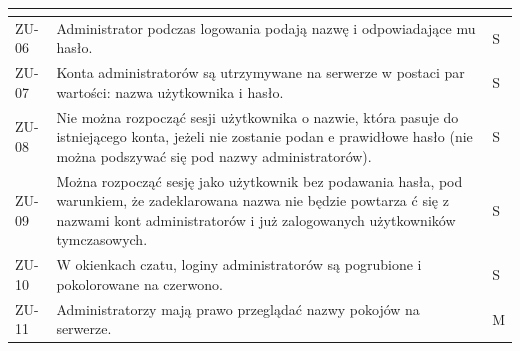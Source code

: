 \begin{tabular}{ | l | l | l | }
{      } \\

    \hline
      \parbox[t]{1.2cm}{
        ZU-06

      } & \parbox[t]{12.1cm}{\strut
        Administrator podczas logowania podają nazwę i odpowiadające mu hasło.

      \strut} & \parbox{1.8cm}{
        S

      } \\

    \hline
      \parbox[t]{1.2cm}{
        ZU-07

      } & \parbox[t]{12.1cm}{\strut
        Konta administratorów są utrzymywane na serwerze w postaci par wartości: nazwa użytkownika i hasło.

      \strut} & \parbox{1.8cm}{
        S

      } \\

    \hline
      \parbox[t]{1.2cm}{
        ZU-08
      } & \parbox[t]{12.1cm}{\strut
      Nie można rozpocząć sesji użytkownika o nazwie, która pasuje do istniejącego konta, jeżeli nie zostanie podan e
      prawidłowe hasło (nie można podszywać się pod nazwy administratorów).
    \strut} & \parbox{1.8cm}{
      S

    } \\

    \hline
      \parbox[t]{1.2cm}{
        ZU-09
      } & \parbox[t]{12.1cm}{\strut
      Można rozpocząć sesję jako użytkownik bez podawania hasła, pod warunkiem, że zadeklarowana nazwa nie będzie powtarza  ć
      się z nazwami kont administratorów i już zalogowanych użytkowników tymczasowych.
    \strut} & \parbox{1.8cm}{
      S

    } \\

    \hline
      \parbox[t]{1.2cm}{
        ZU-10

      } & \parbox[t]{12.1cm}{\strut
      W okienkach czatu, loginy administratorów są pogrubione i pokolorowane na czerwono.

        \strut} & \parbox{1.8cm}{
          S

        } \\

    \hline
      \parbox[t]{1.2cm}{
        ZU-11

      } & \parbox[t]{12.1cm}{\strut
        Administratorzy mają prawo przeglądać nazwy pokojów na serwerze.

      \strut} & \parbox{1.8cm}{
        M

}
\end{tabular}
